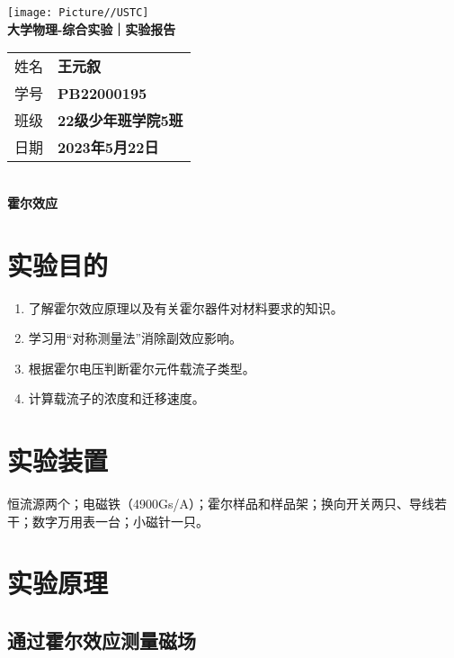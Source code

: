 \documentclass[10pt,a4paper]{article}
\newcommand{\nexp}{霍尔效应}
\begin{document}
	\vspace*{-5em}
	\begin{center}
		\texttt{[image: Picture//USTC]}\\
		\Large \textbf{大学物理-综合实验｜实验报告}\\[5mm]

		\normalsize
		\begin{tabular}{ll}
			姓名 & \textbf{王元叙}\\
			学号 & \textbf{PB22000195}\\
			班级 & \textbf{22级少年班学院5班}\\
			日期 & \textbf{2023年5月22日}\\	
		\end{tabular}\\[5mm]

		\LARGE \textbf{\nexp}\\[5mm]	

	\end{center}

	\section{实验目的}

	\begin{enumerate}
		\item 了解霍尔效应原理以及有关霍尔器件对材料要求的知识。
		\item 学习用“对称测量法”消除副效应影响。
		\item 根据霍尔电压判断霍尔元件载流子类型。
		\item 计算载流子的浓度和迁移速度。
	\end{enumerate}


	\section{实验装置}
	
	恒流源两个；电磁铁（4900Gs/A）；霍尔样品和样品架；换向开关两只、导线若干；数字万用表一台；小磁针一只。



	\section{实验原理}

	\subsection{通过霍尔效应测量磁场}
	
\end{document}
